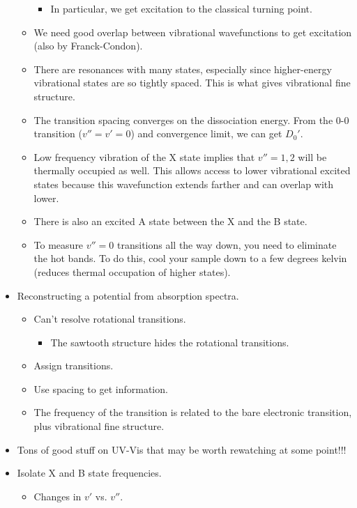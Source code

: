 \documentclass[../notes.tex]{subfiles}
\begin{document}
\begin{itemize}
\begin{itemize}
\begin{itemize}
            \item In particular, we get excitation to the classical turning point.
        \end{itemize}
        \item We need good overlap between vibrational wavefunctions to get excitation (also by Franck-Condon).
        \item There are resonances with many states, especially since higher-energy vibrational states are so tightly spaced. This is what gives vibrational fine structure.
        \item The transition spacing converges on the dissociation energy. From the 0-0 transition ($v''=v'=0$) and convergence limit, we can get $D_0'$.
        \item Low frequency vibration of the X state implies that $v''=1,2$ will be thermally occupied as well. This allows access to lower vibrational excited states because this wavefunction extends farther and can overlap with lower.
        \item There is also an excited A state between the X and the B state.
        \item To measure $v''=0$ transitions all the way down, you need to eliminate the hot bands. To do this, cool your sample down to a few degrees kelvin (reduces thermal occupation of higher states).
    \end{itemize}
    \item Reconstructing a potential from absorption spectra.
    \begin{itemize}
        \item Can't resolve rotational transitions.
        \begin{itemize}
            \item The sawtooth structure hides the rotational transitions.
        \end{itemize}
        \item Assign transitions.
        \item Use spacing to get information.
        \item The frequency of the transition is related to the bare electronic transition, plus vibrational fine structure.
    \end{itemize}
    \item Tons of good stuff on UV-Vis that may be worth rewatching at some point!!!
    \item Isolate X and B state frequencies.
    \begin{itemize}
        \item Changes in $v'$ vs. $v''$.

\end{itemize}
\end{itemize}
\end{document}
